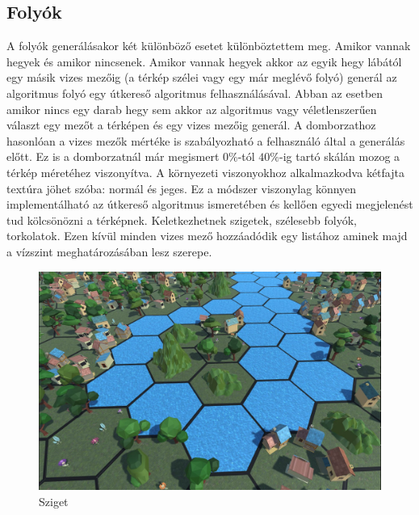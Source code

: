 \subsection{Folyók}

A folyók generálásakor két különböző esetet különböztettem meg. Amikor vannak hegyek és amikor nincsenek. Amikor vannak hegyek akkor az egyik hegy lábától egy másik vizes mezőig (a térkép szélei vagy egy már meglévő folyó) generál az algoritmus folyó egy útkereső algoritmus felhasználásával. Abban az esetben amikor nincs egy darab hegy sem akkor az algoritmus vagy véletlenszerűen választ egy mezőt a térképen és egy vizes mezőig generál. A domborzathoz hasonlóan a vizes mezők mértéke is szabályozható a felhasználó által a generálás előtt. Ez is a domborzatnál már megismert $0\%$-tól $40\%$-ig tartó skálán mozog a térkép méretéhez viszonyítva. A környezeti viszonyokhoz alkalmazkodva kétfajta textúra jöhet szóba: normál és jeges. Ez a módszer viszonylag könnyen implementálható az útkereső algoritmus ismeretében és kellően egyedi megjelenést tud kölcsönözni a térképnek. Keletkezhetnek szigetek, szélesebb folyók, torkolatok. Ezen kívül minden vizes mező hozzáadódik egy listához aminek majd a vízszint meghatározásában lesz szerepe.

\begin{figure}[h!]
\centering
\includegraphics[scale=0.3]{kepek/Island.JPG}
\caption{Sziget}
\label{fig:Island}
\end{figure}

